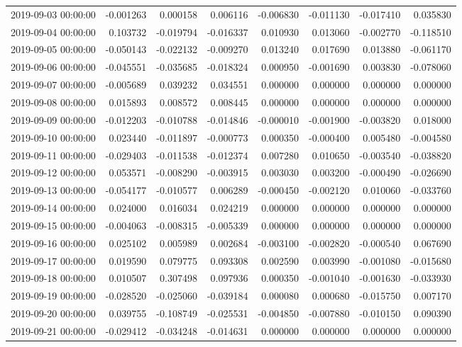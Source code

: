 \begin{tabular}{lrrrrrrr}
2019-09-03 00:00:00 & -0.001263 & 0.000158 & 0.006116 & -0.006830 & -0.011130 & -0.017410 & 0.035830 \\
2019-09-04 00:00:00 & 0.103732 & -0.019794 & -0.016337 & 0.010930 & 0.013060 & -0.002770 & -0.118510 \\
2019-09-05 00:00:00 & -0.050143 & -0.022132 & -0.009270 & 0.013240 & 0.017690 & 0.013880 & -0.061170 \\
2019-09-06 00:00:00 & -0.045551 & -0.035685 & -0.018324 & 0.000950 & -0.001690 & 0.003830 & -0.078060 \\
2019-09-07 00:00:00 & -0.005689 & 0.039232 & 0.034551 & 0.000000 & 0.000000 & 0.000000 & 0.000000 \\
2019-09-08 00:00:00 & 0.015893 & 0.008572 & 0.008445 & 0.000000 & 0.000000 & 0.000000 & 0.000000 \\
2019-09-09 00:00:00 & -0.012203 & -0.010788 & -0.014846 & -0.000010 & -0.001900 & -0.003820 & 0.018000 \\
2019-09-10 00:00:00 & 0.023440 & -0.011897 & -0.000773 & 0.000350 & -0.000400 & 0.005480 & -0.004580 \\
2019-09-11 00:00:00 & -0.029403 & -0.011538 & -0.012374 & 0.007280 & 0.010650 & -0.003540 & -0.038820 \\
2019-09-12 00:00:00 & 0.053571 & -0.008290 & -0.003915 & 0.003030 & 0.003200 & -0.000490 & -0.026690 \\
2019-09-13 00:00:00 & -0.054177 & -0.010577 & 0.006289 & -0.000450 & -0.002120 & 0.010060 & -0.033760 \\
2019-09-14 00:00:00 & 0.024000 & 0.016034 & 0.024219 & 0.000000 & 0.000000 & 0.000000 & 0.000000 \\
2019-09-15 00:00:00 & -0.004063 & -0.008315 & -0.005339 & 0.000000 & 0.000000 & 0.000000 & 0.000000 \\
2019-09-16 00:00:00 & 0.025102 & 0.005989 & 0.002684 & -0.003100 & -0.002820 & -0.000540 & 0.067690 \\
2019-09-17 00:00:00 & 0.019590 & 0.079775 & 0.093308 & 0.002590 & 0.003990 & -0.001080 & -0.015680 \\
2019-09-18 00:00:00 & 0.010507 & 0.307498 & 0.097936 & 0.000350 & -0.001040 & -0.001630 & -0.033930 \\
2019-09-19 00:00:00 & -0.028520 & -0.025060 & -0.039184 & 0.000080 & 0.000680 & -0.015750 & 0.007170 \\
2019-09-20 00:00:00 & 0.039755 & -0.108749 & -0.025531 & -0.004850 & -0.007880 & -0.010150 & 0.090390 \\
2019-09-21 00:00:00 & -0.029412 & -0.034248 & -0.014631 & 0.000000 & 0.000000 & 0.000000 & 0.000000 \\

\end{tabular}
